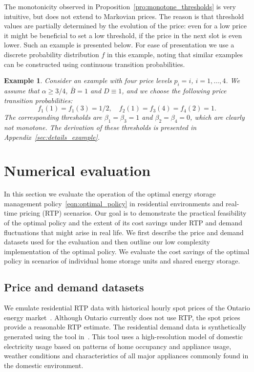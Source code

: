 \documentclass[journal]{IEEEtran}
\newcommand{\Bmax}{\bar{B}}
\newcommand\1{\mathbf{1}}
\newtheorem{example}{Example}
\begin{document}
The monotonicity observed in Proposition~\ref{pro:monotone_thresholds} is very intuitive, but does not extend to Markovian prices. The reason is that threshold values are partially determined by the evolution of the price: even for a low price it might be beneficial to set a low threshold, if the price in the next slot is even lower. Such an example is presented below. For ease of presentation we use a discrete probability distribution $f$ in this example, noting that similar examples can be constructed using continuous transition probabilities.
\begin{example}\label{exa:example}
Consider an example with four price levels $p_i = i$, $i = 1,\dots,4$. We assume that $\alpha \ge 3/4$, $\Bmax = 1$ and $D \equiv 1$, and we choose the following price transition probabilities:
\begin{equation*}
f_1(1) = f_1(3) = 1/2, \quad f_2(1) = f_3(4) = f_4(2) = 1.
\end{equation*}
The corresponding thresholds are $\beta_1 = \beta_3 = 1$ and $\beta_2 = \beta_4 = 0$, which are clearly not monotone. The derivation of these thresholds is presented in Appendix~\ref{sec:details_example}.
\end{example}



\section{Numerical evaluation}\label{sec:example}

In this section we evaluate the operation of the optimal energy storage management policy~\eqref{eqn:optimal_policy} in residential environments and real-time pricing (RTP) scenarios.
Our goal is to demonstrate the practical feasibility of the optimal policy and the extent
of its cost savings under RTP and demand fluctuations that might arise in real life.
We first describe the price and demand datasets used for the evaluation and then outline
our low complexity implementation of the optimal policy.
We evaluate the cost savings of the optimal policy in scenarios of
individual home storage units and shared energy storage.

\subsection{Price and demand datasets}

We emulate residential RTP data with historical hourly
spot prices of the Ontario energy market~\cite{Ontario2010}. Although
Ontario currently does not use RTP, the spot prices provide
a reasonable RTP estimate.
The residential demand data is synthetically generated using
the tool in~\cite{RTIC10}. This tool uses a high-resolution model of
domestic electricity usage based on patterns of home
occupancy and appliance usage, weather conditions and characteristics of all major appliances commonly found in the
domestic environment.
\end{document}
